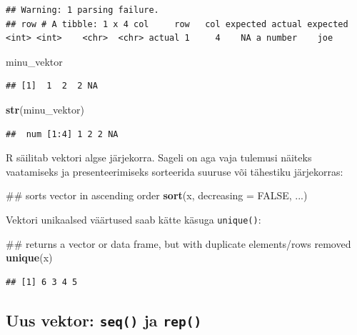 \documentclass[]{book}
\newenvironment{Shaded}{\begin{snugshade}}{\end{snugshade}}
\newcommand{\KeywordTok}[1]{\textcolor[rgb]{0.13,0.29,0.53}{\textbf{#1}}}
\newcommand{\DataTypeTok}[1]{\textcolor[rgb]{0.13,0.29,0.53}{#1}}
\newcommand{\OtherTok}[1]{\textcolor[rgb]{0.56,0.35,0.01}{#1}}
\newcommand{\NormalTok}[1]{#1}
\begin{document}
\begin{verbatim}
## Warning: 1 parsing failure.
## row # A tibble: 1 x 4 col     row   col expected actual expected   <int> <int>    <chr>  <chr> actual 1     4    NA a number    joe
\end{verbatim}

\begin{Shaded}
\begin{Highlighting}[]
\NormalTok{minu_vektor}
\end{Highlighting}
\end{Shaded}

\begin{verbatim}
## [1]  1  2  2 NA
\end{verbatim}

\begin{Shaded}
\begin{Highlighting}[]
\KeywordTok{str}\NormalTok{(minu_vektor)}
\end{Highlighting}
\end{Shaded}

\begin{verbatim}
##  num [1:4] 1 2 2 NA
\end{verbatim}

R säilitab vektori algse järjekorra. Sageli on aga vaja tulemusi näiteks
vaatamiseks ja presenteerimiseks sorteerida suuruse või tähestiku
järjekorras:

\begin{Shaded}
\begin{Highlighting}[]
\NormalTok{## sorts vector in ascending order}
\KeywordTok{sort}\NormalTok{(x, }\DataTypeTok{decreasing =} \OtherTok{FALSE}\NormalTok{, ...)}
\end{Highlighting}
\end{Shaded}

Vektori unikaalsed väärtused saab kätte käsuga \texttt{unique()}:

\begin{Shaded}
\begin{Highlighting}[]
\NormalTok{## returns a vector or data frame, but with duplicate elements/rows removed}
\KeywordTok{unique}\NormalTok{(x)}
\end{Highlighting}
\end{Shaded}

\begin{verbatim}
## [1] 6 3 4 5
\end{verbatim}

\subsection{\texorpdfstring{Uus vektor: \texttt{seq()} ja
\texttt{rep()}}{Uus vektor: seq() ja rep()}}\label{uus-vektor-seq-ja-rep}
\end{document}
